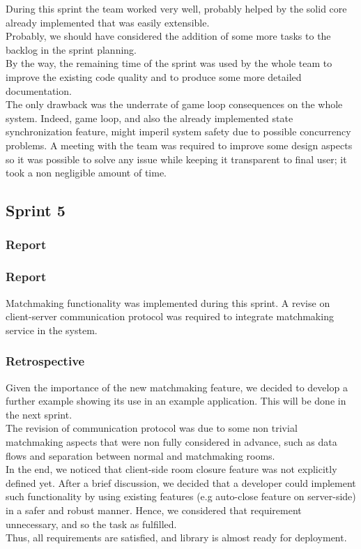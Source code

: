 During this sprint the team worked very well, probably helped by the solid core already implemented that was easily extensible.
\\
Probably, we should have considered the addition of some more tasks to the backlog in the sprint planning.
\\
By the way, the remaining time of the sprint was used by the whole team to improve the existing code quality and to produce some more detailed documentation.
\\
The only drawback was the underrate of game loop consequences on the whole system. Indeed, game loop, and also the already implemented state synchronization feature, might imperil system safety due to possible concurrency problems. A meeting with the team was required to improve some design aspects so it was possible to solve any issue while keeping it transparent to final user; it took a non negligible amount of time.

\subsection{Sprint 5}
\subsubsection{Report}
\subsubsection{Report}
Matchmaking functionality was implemented during this sprint.
A revise on client-server communication protocol was required to integrate matchmaking service in the system.

\subsubsection{Retrospective}

Given the importance of the new matchmaking feature, we decided to develop a further example showing its use in an example application. This will be done in the next sprint.
\\
The revision of communication protocol was due to some non trivial matchmaking aspects that were non fully considered in advance, such as data flows and separation between normal and matchmaking rooms. 
\\
In the end, we noticed that client-side room closure feature was not explicitly defined yet. 
After a brief discussion, we decided that a developer could implement such functionality by using existing features (e.g auto-close feature on server-side) in a safer and robust manner. Hence, we considered that requirement unnecessary, and so the task as fulfilled.
\\
Thus, all requirements are satisfied, and library is almost ready for deployment.


